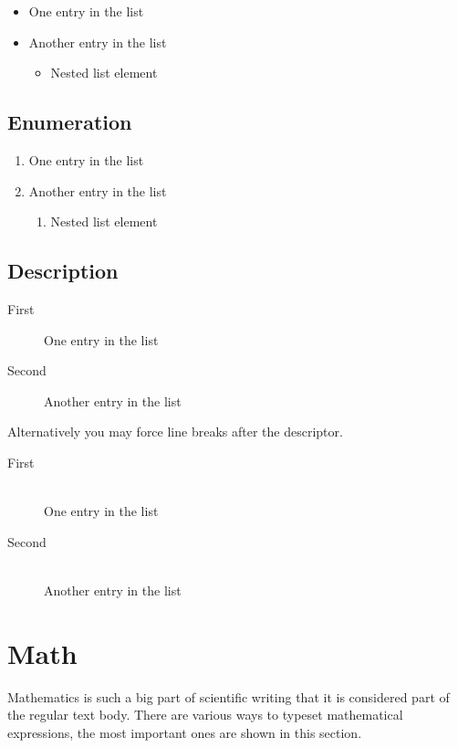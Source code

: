 \begin{itemize}
	\item One entry in the list
	\item Another entry in the list
	      \begin{itemize}
		      \item Nested list element
	      \end{itemize}
\end{itemize}

\subsection{Enumeration}

\begin{enumerate}
	\item One entry in the list
	\item Another entry in the list
	      \begin{enumerate}
		      \item Nested list element
	      \end{enumerate}
\end{enumerate}

\subsection{Description}

\begin{description}
	\item[First] One entry in the list
	\item[Second] Another entry in the list
\end{description}

Alternatively you may force line breaks after the descriptor.

\begin{description}
	\item[First]\hfill\\
	      One entry in the list
	\item[Second]\hfill\\
	      Another entry in the list
\end{description}

\section{Math}

Mathematics is such a big part of scientific writing that it is considered part of the regular text body.
There are various ways to typeset mathematical expressions, the most important ones are shown in this section.

